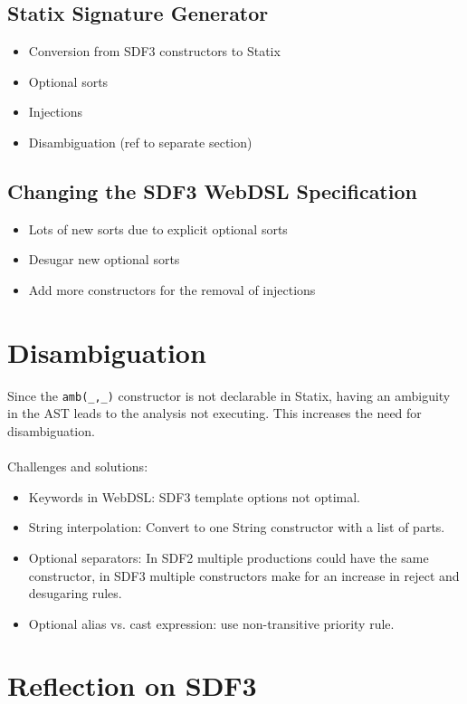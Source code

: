     \subsection{Statix Signature Generator}

      \begin{itemize}
        \item Conversion from SDF3 constructors to Statix
        \item Optional sorts
        \item Injections
        \item Disambiguation (ref to separate section)
      \end{itemize}

    \subsection{Changing the SDF3 WebDSL Specification}

      \begin{itemize}
        \item Lots of new sorts due to explicit optional sorts
        \item Desugar new optional sorts
        \item Add more constructors for the removal of injections
      \end{itemize}

  \section{Disambiguation}
  
    Since the \texttt{amb(\_,\_)} constructor is not declarable in Statix, having an ambiguity in the AST leads to the analysis not executing. This increases the need for disambiguation.
    \\\\Challenges and solutions:
    \begin{itemize}
      \item Keywords in WebDSL: SDF3 template options not optimal.
      \item String interpolation: Convert to one String constructor with a list of parts.
      \item Optional separators: In SDF2 multiple productions could have the same constructor, in SDF3 multiple constructors make for an increase in reject and desugaring rules.
      \item Optional alias vs. cast expression: use non-transitive priority rule.
    \end{itemize}

  \section{Reflection on SDF3}
